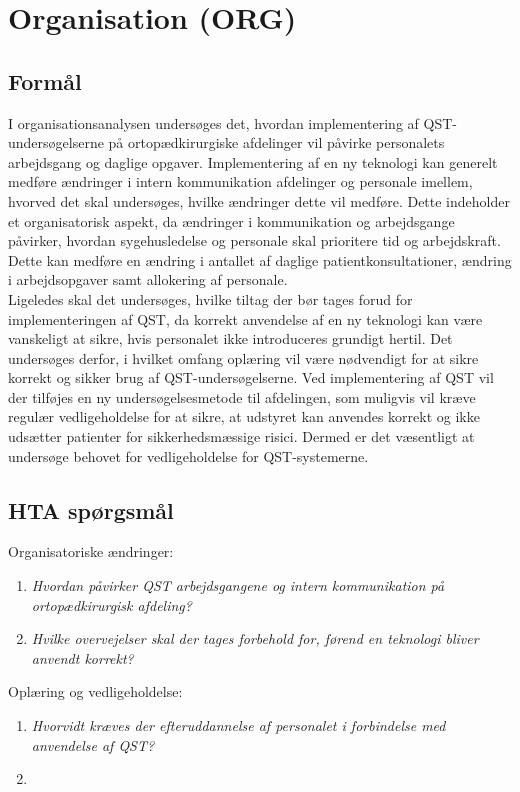\chapter{Organisation (ORG)}


\section{Formål}
I organisationsanalysen undersøges det, hvordan implementering af QST-undersøgelserne på ortopædkirurgiske afdelinger vil påvirke personalets arbejdsgang og daglige opgaver. Implementering af en ny teknologi kan generelt medføre ændringer i intern kommunikation afdelinger og personale imellem, hvorved det skal undersøges, hvilke ændringer dette vil medføre. Dette indeholder et organisatorisk aspekt, da ændringer i kommunikation og arbejdsgange påvirker, hvordan sygehusledelse og personale skal prioritere tid og arbejdskraft. Dette kan medføre en ændring i antallet af daglige patientkonsultationer, ændring i arbejdsopgaver samt allokering af personale. \\
Ligeledes skal det undersøges, hvilke tiltag der bør tages forud for implementeringen af QST, da korrekt anvendelse af en ny teknologi kan være vanskeligt at sikre, hvis personalet ikke introduceres grundigt hertil. Det undersøges derfor, i hvilket omfang oplæring vil være nødvendigt for at sikre korrekt og sikker brug af QST-undersøgelserne. Ved implementering af QST vil der tilføjes en ny undersøgelsesmetode til afdelingen, som muligvis vil kræve regulær vedligeholdelse for at sikre, at udstyret kan anvendes korrekt og ikke udsætter patienter for sikkerhedsmæssige risici. Dermed er det væsentligt at undersøge behovet for vedligeholdelse for QST-systemerne.


\section{HTA spørgsmål}
Organisatoriske ændringer:
\begin{enumerate}
\item \textit{Hvordan påvirker QST arbejdsgangene og intern kommunikation på ortopædkirurgisk afdeling?} %
\item \textit{Hvilke overvejelser skal der tages forbehold for, førend en teknologi bliver anvendt korrekt?} %
\end{enumerate}
Oplæring og vedligeholdelse:
\begin{enumerate}[resume]
\item \textit{Hvorvidt kræves der efteruddannelse af personalet i forbindelse med anvendelse af QST?} %
\item {} %
\end{enumerate}


